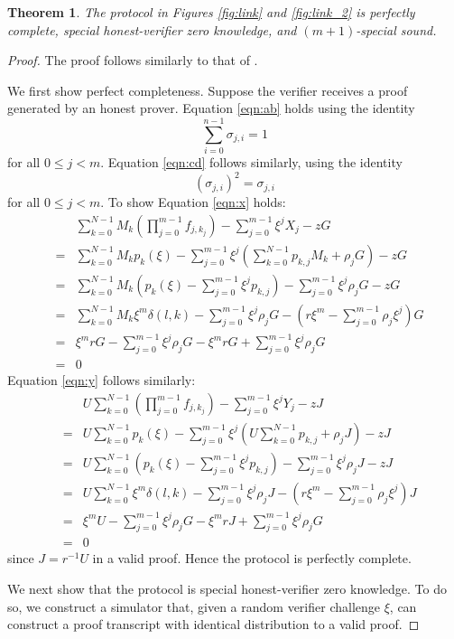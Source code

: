 \documentclass{article}
\newcommand{\sumi}{\sum_{i=0}^{n-1}}
\newcommand{\sumj}{\sum_{j=0}^{m-1}}
\newcommand{\sumk}{\sum_{k=0}^{N-1}}
\newtheorem{theorem}{Theorem}
\theoremstyle{definition}
\begin{document}
\begin{theorem}
The protocol in Figures \ref{fig:link} and \ref{fig:link_2} is perfectly complete, special honest-verifier zero knowledge, and $(m+1)$-special sound.
\end{theorem}

\begin{proof}
The proof follows similarly to that of \cite{bootle}.

We first show perfect completeness.
Suppose the verifier receives a proof generated by an honest prover.
Equation \ref{eqn:ab} holds using the identity $$\sumi \sigma_{j,i} = 1$$ for all $0 \leq j < m$.
Equation \ref{eqn:cd} follows similarly, using the identity $$\left(\sigma_{j,i}\right)^2 = \sigma_{j,i}$$ for all $0 \leq j < m$.
To show Equation \ref{eqn:x} holds:
\begin{eqnarray*}
&& \sumk M_k \left( \prod_{j=0}^{m-1} f_{j,k_j} \right) - \sumj \xi^jX_j - zG \\
&=& \sumk M_k p_k(\xi) - \sumj \xi^j \left( \sumk p_{k,j}M_k + \rho_jG \right) - zG \\
&=& \sumk M_k \left( p_k(\xi) - \sumj \xi^j p_{k,j} \right) - \sumj \xi^j \rho_jG - zG \\
&=& \sumk M_k \xi^m \delta(l,k) - \sumj \xi^j \rho_jG - \left( r\xi^m - \sumj \rho_j\xi^j \right)G \\
&=& \xi^mrG - \sumj \xi^j \rho_jG - \xi^mrG + \sumj \xi^j \rho_jG \\
&=& 0
\end{eqnarray*}
Equation \ref{eqn:y} follows similarly:
\begin{eqnarray*}
&& U \sumk \left( \prod_{j=0}^{m-1} f_{j,k_j} \right) - \sumj \xi^jY_j - zJ \\
&=& U \sumk p_k(\xi) - \sumj \xi^j \left( U \sumk p_{k,j} + \rho_jJ \right) - zJ \\
&=& U \sumk \left( p_k(\xi) - \sumj \xi^j p_{k,j} \right) - \sumj \xi^j \rho_jJ - zJ \\
&=& U \sumk \xi^m \delta(l,k) - \sumj \xi^j \rho_jJ - \left( r\xi^m - \sumj \rho_j\xi^j \right)J \\
&=& \xi^mU - \sumj \xi^j \rho_jG - \xi^mrJ + \sumj \xi^j \rho_jG \\
&=& 0
\end{eqnarray*}
since $J = r^{-1}U$ in a valid proof.
Hence the protocol is perfectly complete.

We next show that the protocol is special honest-verifier zero knowledge.
To do so, we construct a simulator that, given a random verifier challenge $\xi$, can construct a proof transcript with identical distribution to a valid proof.


\end{proof}
\end{document}
